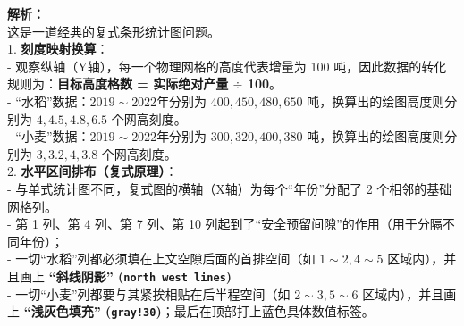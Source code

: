 \begin{center}
\end{center}

\vspace{0.8cm}

{\small\color{gray}
\textbf{解析：}\\
这是一道经典的复式条形统计图问题。\\
1. \textbf{刻度映射换算}：\\
- 观察纵轴（Y轴），每一个物理网格的高度代表增量为 100 吨，因此数据的转化规则为：\textbf{目标高度格数 = 实际绝对产量 $\div$ 100}。\\
- “水稻”数据：$2019\sim 2022$年分别为 $400, 450, 480, 650$ 吨，换算出的绘图高度则分别为 $4, 4.5, 4.8, 6.5$ 个网高刻度。\\
- “小麦”数据：$2019\sim 2022$年分别为 $300, 320, 400, 380$ 吨，换算出的绘图高度则分别为 $3, 3.2, 4, 3.8$ 个网高刻度。\\
2. \textbf{水平区间排布（复式原理）}：\\
- 与单式统计图不同，复式图的横轴（X轴）为每个“年份”分配了 2 个相邻的基础网格列。\\
- 第 1 列、第 4 列、第 7 列、第 10 列起到了“安全预留间隙”的作用（用于分隔不同年份）；\\
- 一切“水稻”列都必须填在上文空隙后面的首排空间（如 $1\sim2, 4\sim5$ 区域内），并且画上 \textbf{“斜线阴影” (\texttt{north west lines})}\\
- 一切“小麦”列都要与其紧挨相贴在后半程空间（如 $2\sim3, 5\sim6$ 区域内），并且画上 \textbf{“浅灰色填充” (\texttt{gray!30})}；最后在顶部打上蓝色具体数值标签。
}

